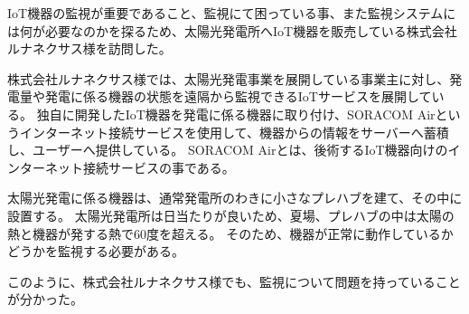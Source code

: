 
IoT機器の監視が重要であること、監視にて困っている事、また監視システムには何が必要なのかを探るため、太陽光発電所へIoT機器を販売している株式会社ルナネクサス様を訪問した。

株式会社ルナネクサス様では、太陽光発電事業を展開している事業主に対し、発電量や発電に係る機器の状態を遠隔から監視できるIoTサービスを展開している。
独自に開発したIoT機器を発電に係る機器に取り付け、SORACOM Airというインターネット接続サービスを使用して、機器からの情報をサーバーへ蓄積し、ユーザーへ提供している。
SORACOM Airとは、後術するIoT機器向けのインターネット接続サービスの事である。

太陽光発電に係る機器は、通常発電所のわきに小さなプレハブを建て、その中に設置する。
太陽光発電所は日当たりが良いため、夏場、プレハブの中は太陽の熱と機器が発する熱で60度を超える。
そのため、機器が正常に動作しているかどうかを監視する必要がある。

このように、株式会社ルナネクサス様でも、監視について問題を持っていることが分かった。
